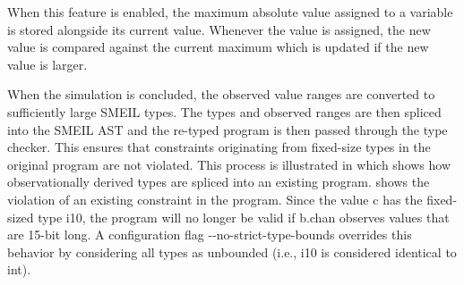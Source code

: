 When this feature is enabled, the maximum absolute value assigned to a variable
is stored alongside its current value. Whenever the value is assigned, the new
value is compared against the current maximum which is updated if the new value
is larger.


When the simulation is concluded, the observed value ranges are converted to
sufficiently large SMEIL types. The types and observed ranges are then spliced
into the SMEIL AST and the re-typed program is then passed through the type
checker. This ensures that constraints originating from fixed-size types in the
original program are not violated. This process is illustrated in
 which shows how observationally derived types are spliced
into an existing program.  shows the violation of an existing
constraint in the program. Since the value {\ttfamily c} has the fixed-sized
type {\ttfamily i10}, the program will no longer be valid if {\ttfamily b.chan}
observes values that are 15-bit long. A configuration flag {\ttfamily
  -{}-no-strict-type-bounds} overrides this behavior by considering all types as
unbounded (i.e., {\ttfamily i10} is considered identical to {\ttfamily int}).


